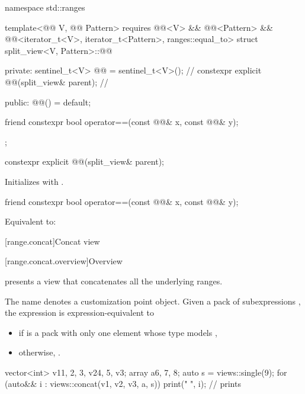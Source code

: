%
\begin{codeblock}
namespace std::ranges {
  template<@@ V, @@ Pattern>
    requires @@<V> && @@<Pattern> &&
             @@<iterator_t<V>, iterator_t<Pattern>, ranges::equal_to>
  struct split_view<V, Pattern>::@@ {
  private:
    sentinel_t<V> @@ = sentinel_t<V>();               // \expos
    constexpr explicit @@(split_view& parent);    // \expos

  public:
    @@() = default;

    friend constexpr bool operator==(const @@& x, const @@& y);
  };
}
\end{codeblock}

%
\begin{itemdecl}
constexpr explicit @@(split_view& parent);
\end{itemdecl}

\begin{itemdescr}
\pnum
\effects
Initializes  with .
\end{itemdescr}

%
\begin{itemdecl}
friend constexpr bool operator==(const @@& x, const @@& y);
\end{itemdecl}

\begin{itemdescr}
\pnum
\effects
Equivalent to: 
\end{itemdescr}

[range.concat]{Concat view}

[range.concat.overview]{Overview}

\pnum
{} presents a view that concatenates all the underlying ranges.

\pnum
The name  denotes
a customization point object.
Given a pack of subexpressions ,
the expression  is expression-equivalent to
\begin{itemize}
\item {} if  is a pack with only one element
whose type models ,
\item otherwise, .
\end{itemize}
\begin{example}
\begin{codeblock}
vector<int> v1{1, 2, 3}, v2{4, 5}, v3{};
array a{6, 7, 8};
auto s = views::single(9);
for (auto&& i : views::concat(v1, v2, v3, a, s)) {
  print("{} ", i);      // prints 
}
\end{codeblock}
\end{example}

